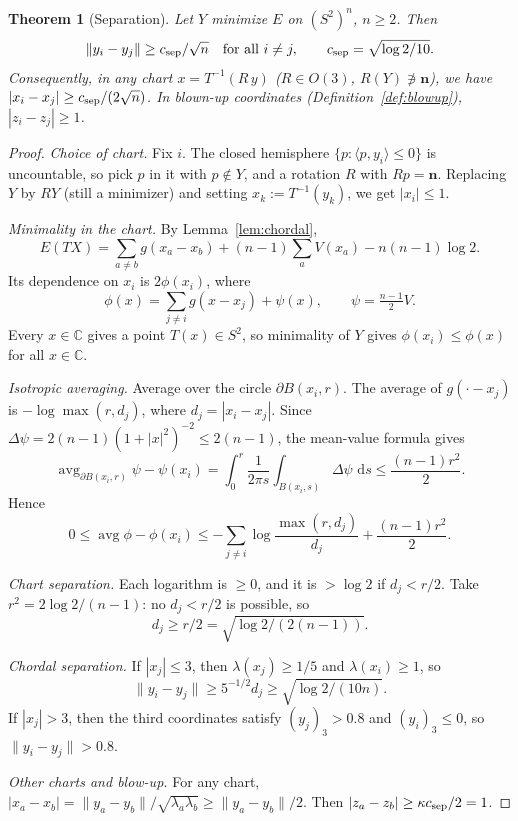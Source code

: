 \documentclass[11pt]{article}
\newtheorem{theorem}{Theorem}[section]
\theoremstyle{definition}
\theoremstyle{remark}
\newcommand{\C}{\mathbb C}
\newcommand{\dd}{\,\mathrm d}
\begin{document}
\begin{theorem}[Separation]\label{thm:separation}
Let $Y$ minimize $E$ on $(S^2)^n$, $n\ge2$. Then
\[
\|y_i-y_j\|\ge c_{\rm sep}/\sqrt n\quad\text{for all }i\neq j,
\qquad c_{\rm sep}=\sqrt{\log2/10}.
\]
Consequently, in any chart $x=T^{-1}(R\,y)$ ($R\in O(3)$, $R(Y)\not\ni\mathbf n$), we have
$|x_i-x_j|\ge c_{\rm sep}/(2\sqrt n)$. In blown-up coordinates (Definition~\ref{def:blowup}),
$|z_i-z_j|\ge1$.
\end{theorem}
\begin{proof}
\emph{Choice of chart.} Fix $i$. The closed hemisphere $\{p:\langle p,y_i\rangle\le0\}$ is
uncountable, so pick $p$ in it with $p\notin Y$, and a rotation $R$ with $Rp=\mathbf n$. Replacing
$Y$ by $RY$ (still a minimizer) and setting $x_k:=T^{-1}(y_k)$, we get $|x_i|\le1$.

\emph{Minimality in the chart.} By Lemma~\ref{lem:chordal},
\[
E(TX)=\sum_{a\neq b}g(x_a-x_b)+(n-1)\sum_aV(x_a)-n(n-1)\log2 .
\]
Its dependence on $x_i$ is $2\phi(x_i)$, where
\[
\phi(x)=\sum_{j\ne i}g(x-x_j)+\psi(x),\qquad \psi=\tfrac{n-1}2V .
\]
Every $x\in\C$ gives a point $T(x)\in S^2$, so minimality of $Y$ gives $\phi(x_i)\le\phi(x)$ for
all $x\in\C$.

\emph{Isotropic averaging.} Average over the circle $\partial B(x_i,r)$. The average of
$g(\cdot-x_j)$ is $-\log\max(r,d_j)$, where $d_j=|x_i-x_j|$. Since
$\Delta\psi=2(n-1)(1+|x|^2)^{-2}\le2(n-1)$, the mean-value formula gives
\[
\operatorname{avg}_{\partial B(x_i,r)}\psi-\psi(x_i)=\int_0^r\frac1{2\pi s}\int_{B(x_i,s)}\Delta\psi\,\dd s\le\frac{(n-1)r^2}2 .
\]
Hence
\[
0\le\operatorname{avg}\phi-\phi(x_i)\le-\sum_{j\neq i}\log\frac{\max(r,d_j)}{d_j}+\frac{(n-1)r^2}{2}.
\]

\emph{Chart separation.} Each logarithm is $\ge0$, and it is $>\log2$ if $d_j<r/2$. Take
$r^2=2\log2/(n-1)$: no $d_j<r/2$ is possible, so
\[
d_j\ge r/2=\sqrt{\log2/(2(n-1))} .
\]

\emph{Chordal separation.} If $|x_j|\le3$, then $\lambda(x_j)\ge1/5$ and $\lambda(x_i)\ge1$, so
\[
\|y_i-y_j\|\ge5^{-1/2}d_j\ge\sqrt{\log2/(10n)} .
\]
If $|x_j|>3$, then the third coordinates satisfy $(y_j)_3>0.8$ and $(y_i)_3\le0$, so
$\|y_i-y_j\|>0.8$.

\emph{Other charts and blow-up.} For any chart, $|x_a-x_b|=\|y_a-y_b\|/\sqrt{\lambda_a\lambda_b}\ge\|y_a-y_b\|/2$.
Then $|z_a-z_b|\ge\kappa c_{\rm sep}/2=1$.
\end{proof}
\end{document}
